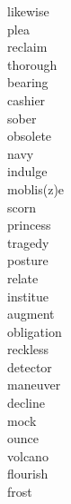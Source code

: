 \documentclass[a4paper, 10pt]{ctexart}
\begin{document}
\begin{multicols*}{2}
\begin{description}
\item[likewise]

\item[plea]

\item[reclaim]

\item[thorough]

\item[bearing]

\item[cashier]

\item[sober]

\item[obsolete]

\item[navy]

\item[indulge]

\item[moblis(z)e]

\item[scorn]

\item[princess]

\item[tragedy]

\item[posture]

\item[relate]

\item[institue]

\item[augment]

\item[obligation]

\item[reckless]

\item[detector]

\item[maneuver]

\item[decline]

\item[mock]

\item[ounce]

\item[volcano]

\item[flourish]

\item[frost]


\end{description}
\end{multicols*}
\end{document}
